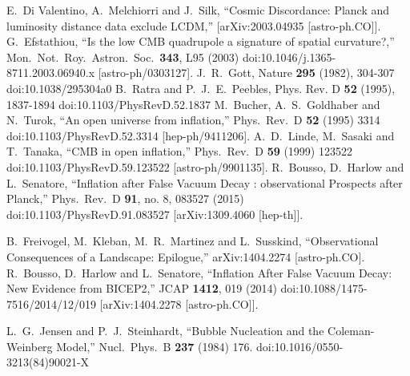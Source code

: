 \documentclass[a4paper,11pt]{article}
\numberwithin{equation}{section}
\begin{document}
\begin{thebibliography}{99}
E.~Di Valentino, A.~Melchiorri and J.~Silk,
``Cosmic Discordance: Planck and luminosity distance data exclude LCDM,''
[arXiv:2003.04935 [astro-ph.CO]].
  G.~Efstathiou,
  ``Is the low CMB quadrupole a signature of spatial curvature?,''
  Mon.\ Not.\ Roy.\ Astron.\ Soc.\  {\bf 343}, L95 (2003)
  doi:10.1046/j.1365-8711.2003.06940.x
  [astro-ph/0303127].
J.~R.~Gott,
Nature \textbf{295} (1982), 304-307
doi:10.1038/295304a0
B.~Ratra and P.~J.~E.~Peebles,
Phys. Rev. D \textbf{52} (1995), 1837-1894
doi:10.1103/PhysRevD.52.1837
  M.~Bucher, A.~S.~Goldhaber and N.~Turok,
  ``An open universe from inflation,''
  Phys.\ Rev.\ D {\bf 52} (1995) 3314
  doi:10.1103/PhysRevD.52.3314
  [hep-ph/9411206].
  A.~D.~Linde, M.~Sasaki and T.~Tanaka,
  ``CMB in open inflation,''
  Phys.\ Rev.\ D {\bf 59} (1999) 123522
  doi:10.1103/PhysRevD.59.123522
  [astro-ph/9901135].
  R.~Bousso, D.~Harlow and L.~Senatore,
  ``Inflation after False Vacuum Decay : observational Prospects after Planck,''
  Phys.\ Rev.\ D {\bf 91}, no. 8, 083527 (2015)
  doi:10.1103/PhysRevD.91.083527
  [arXiv:1309.4060 [hep-th]].

  B.~Freivogel, M.~Kleban, M.~R.~Martinez and L.~Susskind,
  ``Observational Consequences of a Landscape: Epilogue,''
  arXiv:1404.2274 [astro-ph.CO].
  R.~Bousso, D.~Harlow and L.~Senatore,
  ``Inflation After False Vacuum Decay: New Evidence from BICEP2,''
  JCAP {\bf 1412}, 019 (2014)
  doi:10.1088/1475-7516/2014/12/019
  [arXiv:1404.2278 [astro-ph.CO]].

  L.~G.~Jensen and P.~J.~Steinhardt,
  ``Bubble Nucleation and the {Coleman-Weinberg} Model,''
  Nucl.\ Phys.\ B {\bf 237} (1984) 176.
  doi:10.1016/0550-3213(84)90021-X


\end{thebibliography}
\end{document}
